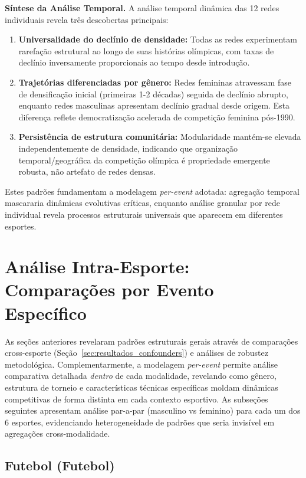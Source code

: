 \textbf{Síntese da Análise Temporal.}
A análise temporal dinâmica das 12 redes individuais revela três descobertas principais:

\begin{enumerate}
    \item \textbf{Universalidade do declínio de densidade:} Todas as redes experimentam rarefação estrutural ao longo de suas histórias olímpicas, com taxas de declínio inversamente proporcionais ao tempo desde introdução.

    \item \textbf{Trajetórias diferenciadas por gênero:} Redes femininas atravessam fase de densificação inicial (primeiras 1-2 décadas) seguida de declínio abrupto, enquanto redes masculinas apresentam declínio gradual desde origem. Esta diferença reflete democratização acelerada de competição feminina pós-1990.

    \item \textbf{Persistência de estrutura comunitária:} Modularidade mantém-se elevada independentemente de densidade, indicando que organização temporal/geográfica da competição olímpica é propriedade emergente robusta, não artefato de redes densas.
\end{enumerate}

Estes padrões fundamentam a modelagem \textit{per-event} adotada: agregação temporal mascararia dinâmicas evolutivas críticas, enquanto análise granular por rede individual revela processos estruturais universais que aparecem em diferentes esportes.

\section{Análise Intra-Esporte: Comparações por Evento Específico}

As seções anteriores revelaram padrões estruturais gerais através de comparações cross-esporte (Seção~\ref{sec:resultados_confounders}) e análises de robustez metodológica. Complementarmente, a modelagem \textit{per-event} permite análise comparativa detalhada \textit{dentro} de cada modalidade, revelando como gênero, estrutura de torneio e características técnicas específicas moldam dinâmicas competitivas de forma distinta em cada contexto esportivo. As subseções seguintes apresentam análise par-a-par (masculino vs feminino) para cada um dos 6 esportes, evidenciando heterogeneidade de padrões que seria invisível em agregações cross-modalidade.

\subsection{Futebol (Futebol)}

